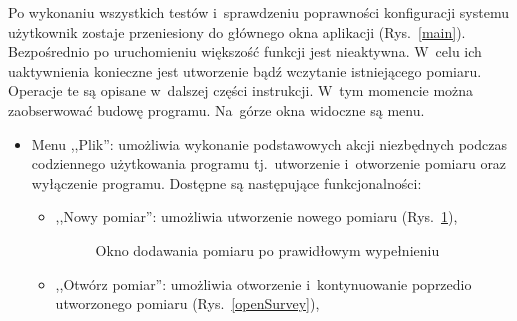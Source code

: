 \noindent Po wykonaniu wszystkich testów i~sprawdzeniu poprawności konfiguracji systemu użytkownik zostaje przeniesiony do głównego okna aplikacji (Rys.~\ref{main}). Bezpośrednio po uruchomieniu większość funkcji jest nieaktywna. W~celu ich uaktywnienia konieczne jest utworzenie bądź wczytanie istniejącego pomiaru. Operacje te są opisane w~dalszej części instrukcji. W~tym momencie można zaobserwować budowę programu. Na~górze okna widoczne są menu.
\begin{itemize}
\item Menu ,,Plik'': umożliwia wykonanie podstawowych akcji niezbędnych podczas codziennego użytkowania programu tj.~utworzenie i~otworzenie pomiaru oraz wyłączenie programu. Dostępne są następujące funkcjonalności:
\begin{itemize}
\item ,,Nowy pomiar'': umożliwia utworzenie nowego pomiaru (Rys.~\ref{newSurveyFilled}),

\begin{figure}[!htb]
\centering 		
  \hspace{2mm}
\caption{Okno dodawania pomiaru po prawidłowym wypełnieniu} 	
\label{newSurveyFilled}
\end{figure}

\item ,,Otwórz pomiar'': umożliwia otworzenie i~kontynuowanie poprzedio utworzonego pomiaru (Rys.~\ref{openSurvey}),


\end{itemize}
\end{itemize}
